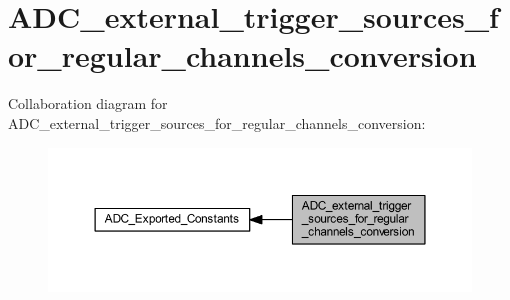 \hypertarget{group___a_d_c__external__trigger__sources__for__regular__channels__conversion}{}\section{A\+D\+C\+\_\+external\+\_\+trigger\+\_\+sources\+\_\+for\+\_\+regular\+\_\+channels\+\_\+conversion}
\label{group___a_d_c__external__trigger__sources__for__regular__channels__conversion}
Collaboration diagram for A\+D\+C\+\_\+external\+\_\+trigger\+\_\+sources\+\_\+for\+\_\+regular\+\_\+channels\+\_\+conversion\+:
\nopagebreak
\begin{figure}[H]
\begin{center}
\leavevmode
\includegraphics[width=350pt]{group___a_d_c__external__trigger__sources__for__regular__channels__conversion}
\end{center}
\end{figure}
